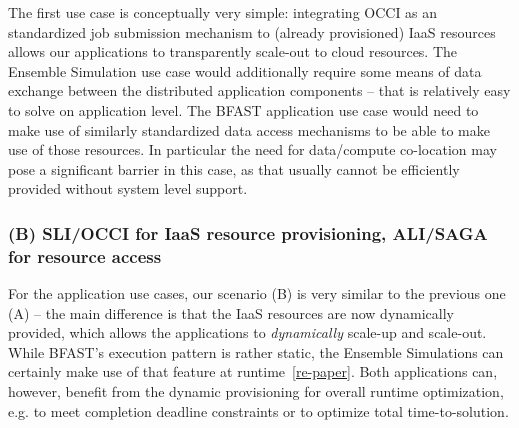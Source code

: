 \documentclass[10pt,conference,final,letterpaper,twoside,twocolumn,]{IEEEtran}
\newcommand{\I}[1]{\textit{#1}}
\begin{document}
 The first use case is conceptually very simple: integrating OCCI as
 an standardized job submission mechanism to (already provisioned)
 IaaS resources allows our applications to transparently scale-out to
 cloud resources.  The Ensemble Simulation use case would additionally
 require some means of data exchange between the distributed
 application components -- that is relatively easy to solve on
 application level.  The BFAST application use case would need to make
 use of similarly standardized data access mechanisms to be able to
 make use of those resources.  In particular the need for data/compute
 co-location may pose a significant barrier in this case, as that
 usually cannot be efficiently provided without system level support.
  

 \subsubsection*{(B) SLI/OCCI for IaaS resource provisioning, ALI/SAGA for
 resource access} 

 For the application use cases, our scenario (B) is very similar to
 the previous one (A) -- the main difference is that the IaaS
 resources are now dynamically provided, which allows the applications
 to \I{dynamically} scale-up and scale-out.  While BFAST's execution
 pattern is rather static, the Ensemble Simulations can certainly make
 use of that feature at runtime~\ref{re-paper}.  Both applications
 can, however, benefit from the dynamic provisioning for overall
 runtime optimization, e.g. to meet completion deadline constraints or
 to optimize total time-to-solution.








\end{document}
